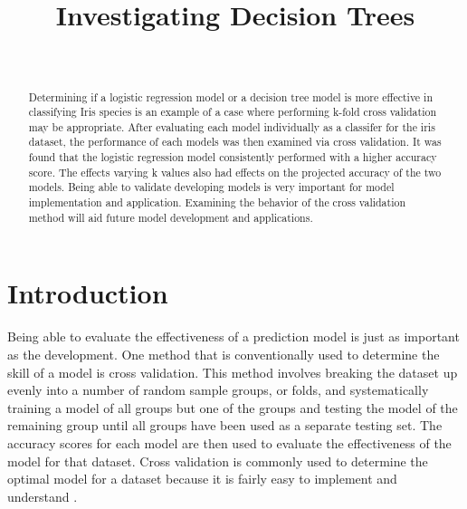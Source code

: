 \documentclass[journal]{IEEEtran}
\begin{document}
\setlength{\emergencystretch}{12pt}
\setlength{\parindent}{10pt}



\lstset{style=mystyle}

\title{Investigating Decision Trees}

\author{
\\
}

\maketitle

\begin{abstract}
\label{log:abstract}
Determining if a logistic regression model or a decision tree model is more effective in classifying Iris species is an example of a case where performing k-fold cross validation may be appropriate. After evaluating each model individually as a classifer for the iris dataset, the performance of each models was then examined via cross validation. It was found that the logistic regression model consistently performed with a higher accuracy score. The effects varying k values also had effects on the projected accuracy of the two models. Being able to validate developing models is very important for model implementation and application. Examining the behavior of the cross validation method will aid future model development and applications. 
\end{abstract}

\section{Introduction}
\label{sec:introduction}
Being able to evaluate the effectiveness of a prediction model is just as important as the development. One method that is conventionally used to determine the skill of a model is cross validation. This method involves breaking the dataset up evenly into a number of random sample groups, or folds, and systematically training a model of all groups but one of the groups and testing the model of the remaining group until all groups have been used as a separate testing set. The accuracy scores for each model are then used to evaluate the effectiveness of the model for that dataset. Cross validation is commonly used to determine the optimal model for a dataset because it is fairly easy to implement and understand \cite{b1}. 
\end{document}
